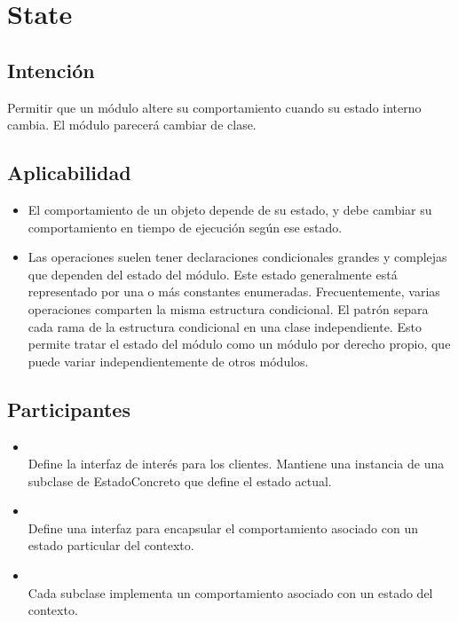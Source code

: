 \section{State}

\label{anexoState}

\subsection*{Intención}

Permitir que un módulo altere su comportamiento cuando su estado interno cambia. El módulo parecerá cambiar de clase.

\subsection*{Aplicabilidad}

\begin{itemize}
\item El comportamiento de un objeto depende de su estado, y debe cambiar su comportamiento en tiempo de ejecución según ese estado.
\item Las operaciones suelen tener declaraciones condicionales grandes y complejas que dependen del estado del módulo. Este estado generalmente está representado por una o más constantes enumeradas. Frecuentemente, varias operaciones comparten la misma estructura condicional. El patrón separa cada rama de la estructura condicional en una clase independiente. Esto permite tratar el estado del módulo como un módulo por derecho propio, que puede variar independientemente de otros módulos.
\end{itemize}

\subsection*{Participantes}

\begin{itemize}
\item \Contexto\\
Define la interfaz de interés para los clientes. Mantiene una instancia de una subclase de EstadoConcreto que define el estado actual.

\item \Estado\\
Define una interfaz para encapsular el comportamiento asociado con un estado particular del contexto.

\item \EstadoConcreto\\
Cada subclase implementa un comportamiento asociado con un estado del contexto.
\end{itemize}


